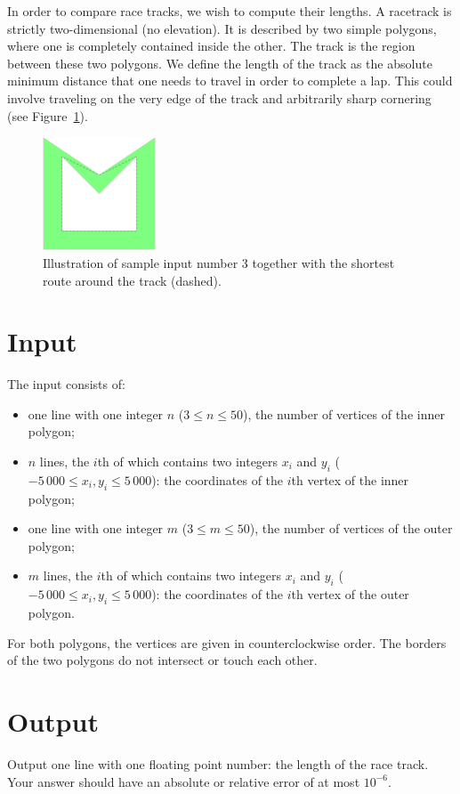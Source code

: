 
\noindent
In order to compare race tracks, we wish to compute their lengths. A racetrack is strictly two-dimensional (no elevation). It is described by two simple polygons, where one is completely contained inside the other. The track is the region between these two polygons. We define the length of the track as the absolute minimum distance that one needs to travel in order to complete a lap. This could involve traveling on the very edge of the track and arbitrarily sharp cornering (see Figure~\ref{fig:racetrack:sample}).

\begin{figure}[h]
    \begin{center}
    \includegraphics[width=0.3\textwidth]{racetrack-3}
    \caption{Illustration of sample input number 3 together with the shortest route around the track (dashed).}
    \label{fig:racetrack:sample}
    \end{center}
\end{figure}

\section*{Input}

The input consists of:
\begin{itemize}
  \item one line with one integer $n$ ($3 \leq n \leq 50$), the number of vertices of the inner polygon;
  \item $n$ lines, the $i$th of which contains two integers $x_i$ and $y_i$ ($ -5\,000 \leq x_i, y_i \leq 5\,000$): the coordinates of the $i$th vertex of the inner polygon;
  \item one line with one integer $m$ ($3 \leq m \leq 50$), the number of vertices of the outer polygon;
  \item $m$ lines, the $i$th of which contains two integers $x_i$ and $y_i$ ($ -5\,000 \leq x_i, y_i \leq 5\,000$): the coordinates of the $i$th vertex of the outer polygon.
\end{itemize}
For both polygons, the vertices are given in counterclockwise order. The borders of the two polygons do not intersect or touch each other.

\section*{Output}

Output one line with one floating point number: the length of the race
track.  Your answer should have an absolute or relative error of at most $10^{-6}$.
